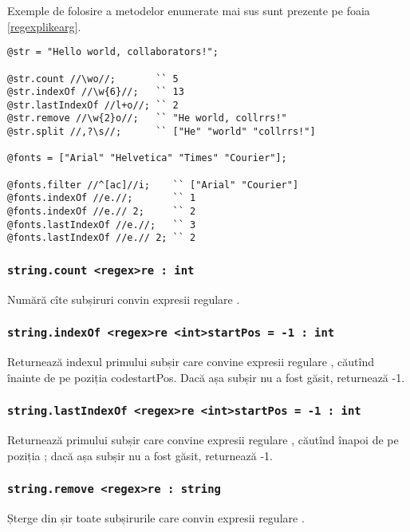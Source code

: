 Exemple de folosire a metodelor enumerate mai sus sunt prezente pe foaia \ref{regexplikearg}.

\begin{lstlisting}[caption=Expresii regulare în calitate de argumente, label=regexplikearg]
@str = "Hello world, collaborators!";

@str.count //\wo//;       `` 5
@str.indexOf //\w{6}//;   `` 13
@str.lastIndexOf //l+o//; `` 2
@str.remove //\w{2}o//;   `` "He world, collrrs!"
@str.split //,?\s//;      `` ["He" "world" "collrrs!"]

@fonts = ["Arial" "Helvetica" "Times" "Courier"];

@fonts.filter //^[ac]//i;    `` ["Arial" "Courier"]
@fonts.indexOf //e.//;       `` 1
@fonts.indexOf //e.// 2;     `` 2
@fonts.lastIndexOf //e.//;   `` 3
@fonts.lastIndexOf //e.// 2; `` 2
\end{lstlisting}

\subsubsection{\lstinline|string.count <regex>re : int|}

Numără cîte subșiruri convin expresii regulare .

\subsubsection{\lstinline|string.indexOf <regex>re <int>startPos = -1 : int|}

Returnează indexul primului subșir care convine expresii regulare , căutînd înainte de pe poziția code{startPos}. Dacă așa subșir nu a fost găsit, returnează -1.

\subsubsection{\lstinline|string.lastIndexOf <regex>re <int>startPos = -1 : int|}

Returnează primului subșir care convine expresii regulare , căutînd înapoi de pe poziția ; dacă așa subșir nu a fost găsit, returnează -1.

\subsubsection{\lstinline|string.remove <regex>re : string|}

Șterge din șir toate subșirurile care convin expresii regulare .

